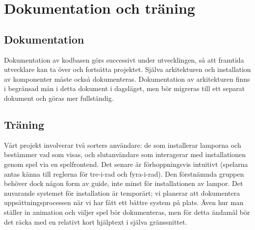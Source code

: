 \documentclass[a4paper,11pt]{article}
\begin{document}
\newpage
\section{Dokumentation och träning}

\subsection*{Dokumentation}
  Dokumentation av kodbasen görs successivt under utvecklingen, så att
  framtida utvecklare kan ta över och fortsätta projektet.  Själva
  arkitekturen och installation av komponenter måste också dokumenteras.
  Dokumentation av arkitekturen finns i begränsad mån i detta dokument i
  dagsläget, men bör migreras till ett separat dokument och göras mer
  fullständig.

\subsection*{Träning}
  Vårt projekt involverar två sorters användare: de som installerar lamporna
  och bestämmer vad som visas, och slutanvändare som interagerar med
  installationen genom spel via en spelfrontend.  Det senare är
  förhoppningsvis intuitivt (spelarna antas känna till reglerna för tre-i-rad
  och fyra-i-rad).  Den förstnämnda gruppen behöver dock någon form av guide,
  inte minst för installationen av lampor.  Det nuvarande systemet för
  installation är temporärt; vi planerar att dokumentera uppsättningsprocessen
  när vi har fått ett bättre system på plats.  Även hur man ställer in
  animation och väljer spel bör dokumenteras, men för detta ändamål bör det
  räcka med en relativt kort hjälptext i själva gränssnittet.
\end{document}
